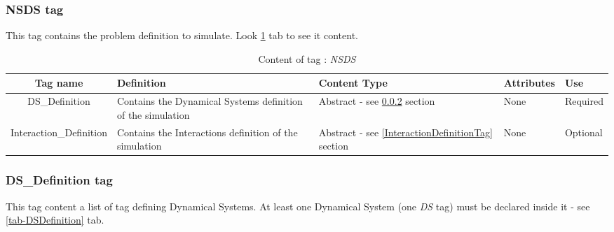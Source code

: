 \subsubsection{NSDS tag}
\label{NSDSTag}

This tag contains the problem definition to simulate. Look \ref{tab-nsds} tab to see it content.

\begin{table}[!hbp]
\begin{center}
\begin{tabular}{|c|p{5cm}|p{2cm}|p{2cm}|p{2cm}|}
\hline
\bf{Tag name} & \bf{Definition} & \bf{Content Type} & \bf{Attributes} & \bf{Use}
\\\hline
\hline
DS\_Definition		  & Contains the Dynamical Systems definition of the simulation & Abstract - see \ref{DSDefinitionTag} section&None&Required \\
\hline
Interaction\_Definition		  & Contains the Interactions definition of the simulation & Abstract - see \ref{InteractionDefinitionTag} section&None&Optional \\
\hline
\end{tabular}
\end{center}
\caption{Content of tag : \textit{NSDS}}
\label{tab-nsds}
\end{table}



\subsubsection{DS\_Definition tag}
\label{DSDefinitionTag}

This tag content a list of tag defining Dynamical Systems. At least one Dynamical System (one \textit{DS} tag) must be declared inside it - see \ref{tab-DSDefinition} tab.\\

